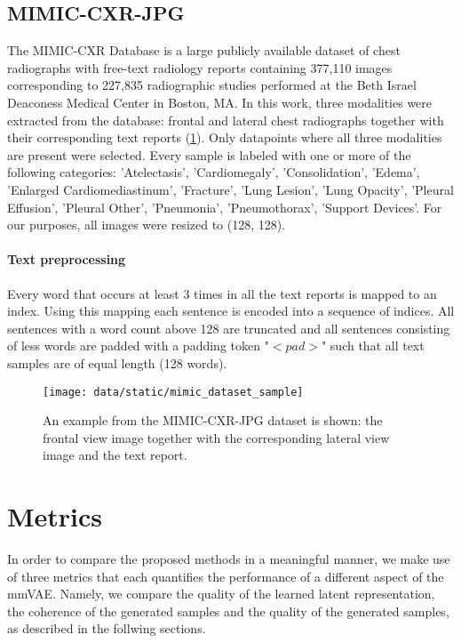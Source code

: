 \subsection{MIMIC-CXR-JPG}
The MIMIC-CXR Database \cite{johnson2019mimic} is a large publicly available dataset of chest radiographs with free-text radiology reports containing 377,110 images corresponding to 227,835 radiographic studies performed at the Beth Israel Deaconess Medical Center in Boston, MA.
In this work, three modalities were extracted from the database: frontal and lateral chest radiographs together with their corresponding text reports (\cref{fig:mimic}).
Only datapoints where all three modalities are present were selected.
Every sample is labeled with one or more of the following categories: 'Atelectasis', 'Cardiomegaly', 'Consolidation', 'Edema', 'Enlarged Cardiomediastinum', 'Fracture', 'Lung Lesion', 'Lung Opacity', 'Pleural Effusion', 'Pleural Other', 'Pneumonia', 'Pneumothorax', 'Support Devices'.
For our purposes, all images were resized to (128, 128).

\paragraph{Text preprocessing}
Every word that occurs at least 3 times in all the text reports is mapped to an index.
Using this mapping each sentence is encoded into a sequence of indices.
All sentences with a word count above 128 are truncated and all sentences consisting of less words are padded with a padding token "$<pad>$" such that all text samples are of equal length (128 words).

\begin{figure}[h!]
    \centering
    \texttt{[image: data/static/mimic\_dataset\_sample]}
    \vspace{-1cm}
    \caption{An example from the MIMIC-CXR-JPG dataset is shown: the frontal view image together with the corresponding lateral view image and the text report.}
    \label{fig:mimic}
\end{figure}



\section{Metrics}
In order to compare the proposed methods in a meaningful manner, we make use of three metrics that each quantifies the performance of a different aspect of the mmVAE.
Namely, we compare the quality of the learned latent representation, the coherence of the generated samples and the quality of the generated samples, as described in the follwing sections.

